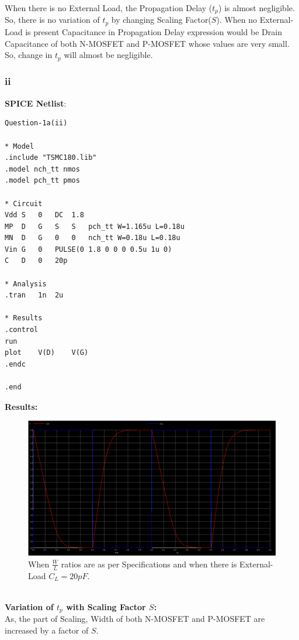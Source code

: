 \documentclass{article}
\begin{document}
\vspace{0.2in}
\qquad When there is no External Load, the Propagation Delay ($t_{p}$) is almost negligible. So, there is no variation of $t_{p}$ by changing Scaling Factor($S$). When no External-Load is present Capacitance in Propagation Delay expression would be Drain Capacitance of both N-MOSFET and P-MOSFET whose values are very small. So, change in $t_{p}$ will almost be negligible. 

\pagebreak
\subsubsection{ii}
\textbf{SPICE Netlist}:
\begin{lstlisting}
Question-1a(ii)

* Model
.include "TSMC180.lib"
.model nch_tt nmos
.model pch_tt pmos

* Circuit
Vdd	S	0	DC	1.8
MP	D	G	S	S	pch_tt W=1.165u L=0.18u
MN	D	G	0	0	nch_tt W=0.18u L=0.18u
Vin	G	0	PULSE(0	1.8 0 0 0 0.5u 1u 0)
C	D	0	20p

* Analysis
.tran	1n	2u

* Results
.control
run
plot	V(D)	V(G)
.endc

.end
\end{lstlisting}
\textbf{Results:}\\
\begin{figure}[!ht]
    \centering
    \includegraphics[scale=0.23]{Images/1aii.png}
    \caption{When $\frac{W}{L}$ ratios are as per Specifications and when there is External-Load $C_{L} = 20pF$.}
\end{figure}
\\
\textbf{Variation of $t_{p}$ with Scaling Factor $S$:}\\
As, the part of Scaling, Width of both N-MOSFET and P-MOSFET are increased by a factor of $S$.
\end{document}
